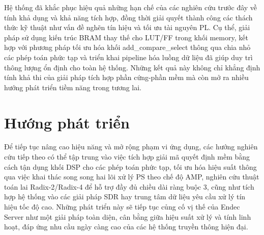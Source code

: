\documentclass[../DoAn.tex]{subfiles}
\begin{document}
Hệ thống đã khắc phục hiệu quả những hạn chế của các nghiên cứu trước đây về tính khả dụng và khả năng tích hợp, đồng thời giải quyết thành công các thách thức kỹ thuật như vấn đề nghẽn tín hiệu và tối ưu tài nguyên PL. Cụ thể, giải pháp sử dụng kiến trúc BRAM thay thế cho LUT/FF trong khối memory, kết hợp với phương pháp tối ưu hóa khối add\_compare\_select thông qua chia nhỏ các phép toán phức tạp và triển khai pipeline hóa luồng dữ liệu đã giúp duy trì thông lượng ổn định cho toàn hệ thống. Những kết quả này không chỉ khẳng định tính khả thi của giải pháp tích hợp phần cứng-phần mềm mà còn mở ra nhiều hướng phát triển tiềm năng trong tương lai.

\section{Hướng phát triển}

Để tiếp tục nâng cao hiệu năng và mở rộng phạm vi ứng dụng, các hướng nghiên cứu tiếp theo có thể tập trung vào việc tích hợp giải mã quyết định mềm bằng cách tận dụng khối DSP cho các phép toán phức tạp, tối ưu hóa hiệu suất thông qua việc khai thác song song hai lõi xử lý PS theo chế độ AMP, nghiên cứu thuật toán lai Radix-2/Radix-4 để hỗ trợ đầy đủ chiều dài ràng buộc 3, cũng như tích hợp hệ thống vào các giải pháp SDR hay trung tâm dữ liệu yêu cầu xử lý tín hiệu tốc độ cao. Những phát triển này sẽ tiếp tục củng cố vị thế của Endec Server như một giải pháp toàn diện, cân bằng giữa hiệu suất xử lý và tính linh hoạt, đáp ứng nhu cầu ngày càng cao của các hệ thống truyền thông hiện đại.
\end{document}
